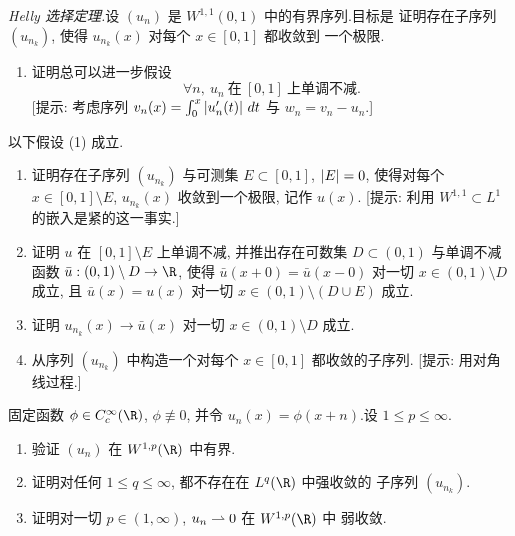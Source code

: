 \begin{exercise}
\label{exer:8.3}
\emph{Helly 选择定理.}设 $(u_n)$ 是 $W^{1,1}(0,1)$ 中的有界序列.目标是
证明存在子序列 $(u_{n_k})$, 使得 $u_{n_k}(x)$ 对每个 $x\in[0,1]$ 都收敛到
一个极限.
\begin{enumerate}[label=\arabic*., leftmargin=2.2em, itemsep=0.3em]
	\item 证明总可以进一步假设
	      \begin{equation}
	      \forall n,\ u_n\ \text{在}\ [0,1]\ \text{上单调不减}.
	      \tag{1}
	      \end{equation}
	      [提示: 考虑序列 $v_n(x)=\int_0^x\left|u_n'(t)\right|\,dt$ 与
	      $w_n=v_n-u_n$.]
\end{enumerate}
以下假设 (1) 成立.
\begin{enumerate}[label=\arabic*., leftmargin=2.2em, itemsep=0.3em, start=2]
	\item 证明存在子序列 $(u_{n_k})$ 与可测集 $E\subset[0,1]$,
	      $\left|E\right|=0$, 使得对每个 $x\in[0,1]\setminus E$, $u_{n_k}(x)$
	      收敛到一个极限, 记作 $u(x)$.
	      [提示: 利用 $W^{1,1}\subset L^1$ 的嵌入是紧的这一事实.]
	\item 证明 $u$ 在 $[0,1]\setminus E$ 上单调不减, 并推出存在可数集
	      $D\subset(0,1)$ 与单调不减函数
	      $\bar u:(0,1)\setminus D\to\R$, 使得
	      $\bar u(x+0)=\bar u(x-0)$ 对一切 $x\in(0,1)\setminus D$ 成立, 且
	      $\bar u(x)=u(x)$ 对一切 $x\in(0,1)\setminus(D\cup E)$ 成立.
	\item 证明 $u_{n_k}(x)\to\bar u(x)$ 对一切 $x\in(0,1)\setminus D$ 成立.
	\item 从序列 $(u_{n_k})$ 中构造一个对每个 $x\in[0,1]$ 都收敛的子序列.
	      [提示: 用对角线过程.]
\end{enumerate}
\end{exercise}

\begin{exercise}
\label{exer:8.4}
固定函数 $\phi\in C_c^\infty(\R)$, $\phi\not\equiv0$, 并令
$u_n(x)=\phi(x+n)$.设 $1\le p\le\infty$.
\begin{enumerate}[label=\arabic*., leftmargin=2.2em, itemsep=0.3em]
	\item 验证 $(u_n)$ 在 $W^{1,p}(\R)$ 中有界.
	\item 证明对任何 $1\le q\le\infty$, 都不存在在 $L^q(\R)$ 中强收敛的
	      子序列 $(u_{n_k})$.
	\item 证明对一切 $p\in(1,\infty)$, $u_n\rightharpoonup0$ 在 $W^{1,p}(\R)$ 中
	      弱收敛.
\end{enumerate}
\end{exercise}

